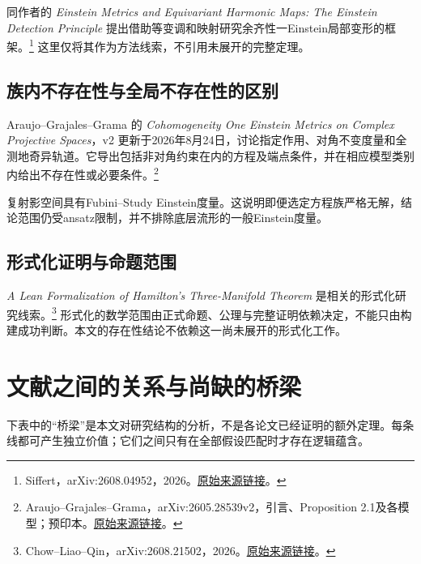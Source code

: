 \documentclass[11pt,a4paper]{article}
\theoremstyle{definition}
\newcommand{\src}[3]{\footnote{\raggedright #1，#2。\href{#3}{原始来源链接}。}}
\begin{document}
同作者的 \emph{Einstein Metrics and Equivariant Harmonic Maps: The Einstein Detection Principle} 提出借助等变调和映射研究余齐性一Einstein局部变形的框架。\src{Siffert}{arXiv:2608.04952，2026}{https://arxiv.org/abs/2608.04952}
这里仅将其作为方法线索，不引用未展开的完整定理。

\subsection{族内不存在性与全局不存在性的区别}

Araujo--Grajales--Grama 的 \emph{Cohomogeneity One Einstein Metrics on Complex Projective Spaces}，v2 更新于2026年8月24日，讨论指定作用、对角不变度量和全测地奇异轨道。它导出包括非对角约束在内的方程及端点条件，并在相应模型类别内给出不存在性或必要条件。\src{Araujo--Grajales--Grama}{arXiv:2605.28539v2，引言、Proposition 2.1及各模型；预印本}{https://arxiv.org/html/2605.28539v2}

复射影空间具有Fubini--Study Einstein度量。这说明即便选定方程族严格无解，结论范围仍受ansatz限制，并不排除底层流形的一般Einstein度量。

\subsection{形式化证明与命题范围}

\emph{A Lean Formalization of Hamilton's Three-Manifold Theorem} 是相关的形式化研究线索。\src{Chow--Liao--Qin}{arXiv:2608.21502，2026}{https://arxiv.org/abs/2608.21502}
形式化的数学范围由正式命题、公理与完整证明依赖决定，不能只由构建成功判断。本文的存在性结论不依赖这一尚未展开的形式化工作。

\section{文献之间的关系与尚缺的桥梁}\label{sec:bridges}

下表中的“桥梁”是本文对研究结构的分析，不是各论文已经证明的额外定理。每条线都可产生独立价值；它们之间只有在全部假设匹配时才存在逻辑蕴含。
\end{document}
